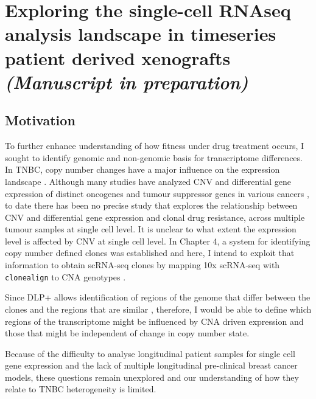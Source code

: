 
{\chapter{Exploring the single-cell RNAseq analysis landscape in timeseries patient derived xenografts 
\\
\textit{(Manuscript in preparation)}}}

 \label{ch:Chapter5}


 \section{Motivation}


To further enhance understanding of how fitness under drug treatment occurs, I sought to identify genomic and non-genomic basis for transcriptome differences. 
In TNBC, copy number changes have a major influence on the expression landscape \cite{wang2016integrative}.
Although many studies have analyzed CNV and differential gene expression of distinct oncogenes and tumour suppressor genes in various cancers \cite{kuzyk2015mycn, budczies2016pan, kwak2015fibroblast}, to date there has been no precise study that explores the relationship between CNV and differential gene expression and clonal drug resistance,  across multiple tumour samples at single cell level. It is unclear to what extent the expression level is affected by CNV at single cell level.
In Chapter 4, a system for identifying copy number defined clones was established and here, I intend to exploit that information to obtain scRNA-seq clones by mapping 10x scRNA-seq with \texttt{clonealign} to CNA genotypes \cite{campbell2019clonealign}.

Since \ac{DLP+} allows identification of regions of the genome that differ between the clones and the regions that are similar \cite{laks2019clonal}, therefore, I would be able to define which regions of the transcriptome might be influenced by CNA driven expression and those that might be independent of change in copy number state.

Because of the difficulty to analyse longitudinal patient samples for single cell gene expression and the lack of multiple longitudinal pre-clinical breast cancer models, these questions remain unexplored and our understanding of how they relate to TNBC heterogeneity is limited.

